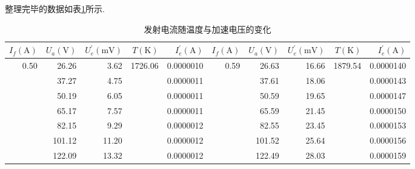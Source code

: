 \documentclass[UTF8,a4paper]{article}%
\begin{document}
整理完毕的数据如表\ref{tb:data}所示.
\begin{table}[H]
    \centering
    \caption{发射电流随温度与加速电压的变化}
    \label{tb:data}
    \begin{tabular}{|r|r|r|r|r||r|r|r|r|r|}
        \hline
        $I_f(\unit{\ampere})$ & $U_a(\unit{\volt})$ & $U_e^\prime(\unit{\milli\volt})$ & $T(\unit{\kelvin})$      & $I_e^\prime(\unit{\ampere})$ & $I_f(\unit{\ampere})$ & $U_a(\unit{\volt})$ & $U_e^\prime(\unit{\milli\volt})$ & $T(\unit{\kelvin})$      & $I_e^\prime(\unit{\ampere})$ \\ \hline
        \multirow{7}{*}{0.50} & 26.26               & 3.62                             & \multirow{7}{*}{1726.06} & 0.0000010                    & \multirow{7}{*}{0.59} & 26.63               & 16.66                            & \multirow{7}{*}{1879.54} & 0.0000140                    \\
                              & 37.27               & 4.75                             &                          & 0.0000011                    &                       & 37.61               & 18.06                            &                          & 0.0000143                    \\
                              & 50.19               & 6.05                             &                          & 0.0000011                    &                       & 50.59               & 19.65                            &                          & 0.0000147                    \\
                              & 65.17               & 7.57                             &                          & 0.0000011                    &                       & 65.59               & 21.45                            &                          & 0.0000150                    \\
                              & 82.15               & 9.29                             &                          & 0.0000012                    &                       & 82.55               & 23.45                            &                          & 0.0000153                    \\
                              & 101.12              & 11.20                            &                          & 0.0000012                    &                       & 101.52              & 25.64                            &                          & 0.0000156                    \\
                              & 122.09              & 13.32                            &                          & 0.0000012                    &                       & 122.49              & 28.03                            &                          & 0.0000159                    \\ \hline

\end{tabular}
\end{table}
\end{document}
